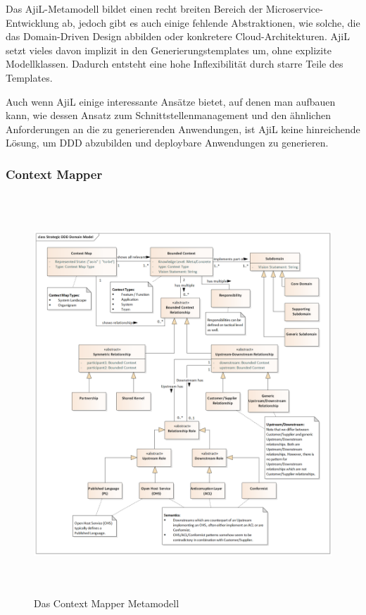Das AjiL-Metamodell bildet einen recht breiten Bereich der Microservice-Entwicklung ab, jedoch gibt es auch einige fehlende Abstraktionen, wie solche, die das Domain-Driven Design abbilden oder konkretere Cloud-Architekturen. AjiL setzt vieles davon implizit in den Generierungstemplates um, ohne explizite Modellklassen. Dadurch entsteht eine hohe Inflexibilität durch starre Teile des Templates.

Auch wenn AjiL einige interessante Ansätze bietet, auf denen man aufbauen kann, wie dessen Ansatz zum Schnittstellenmanagement und den ähnlichen Anforderungen an die zu generierenden Anwendungen, ist AjiL keine hinreichende Lösung, um DDD abzubilden und deploybare Anwendungen zu generieren.

\newpage

\subsubsection{Context Mapper}

\begin{figure}[ht]
\centering
\includegraphics[height=15cm]{bilder/k3/k3_context_mapper.png}
\caption[Das Context Mapper Metamodell]{Das Context Mapper Metamodell \cite[S.3]{mapper}}
\end{figure}

